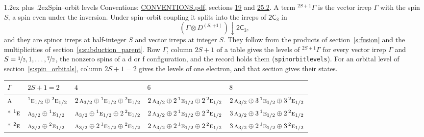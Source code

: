 \documentclass[10pt,a4paper]{article}
\makeatletter
\renewcommand\section{\@startsection{section}{1}{\z@}{-3ex plus -1ex minus -.2ex}%
  {1.2ex plus .2ex}{\normalfont\large\sffamily\bfseries\color{parttitle}}}
\numberwithin{equation}{section}
\newcommand{\grp}[1]{\mathsf{#1}}
\newcommand{\irr}[1]{\text{\normalfont\scshape #1}}
\newcommand{\conjpair}[1]{{}^{#1}}
\newcommand{\restr}[2]{#1\!\downarrow#2}
\newcommand{\irrJp}[2]{D^{(#1,#2)}}
\newcommand{\irrprod}{\otimes}
\newcommand{\term}[2]{{}^{#1}#2}
\makeatother
\begin{document}
\section{Spin--orbit levels}\label{s:spin_orbit}
Conventions: \href{../../CONVENTIONS.pdf}{CONVENTIONS.pdf}, sections \href{../../../rotation/CONVENTIONS.pdf\#conv.19}{19} and \href{../../CONVENTIONS.pdf\#conv.25.2}{25.2}.
\leavevmode\label{n:local.spin}\label{n:symbol.term}A term $\term{2S+1}{\Gamma}$ is the vector irrep $\Gamma$ with the spin $S$, a spin even under the inversion. Under spin--orbit coupling it splits into the irreps of $\grp{2C_{3}}$ in
\begin{equation}\label{e:spinorbit}\restr{(\Gamma \irrprod \irrJp{S}{+1})}{\grp{2C_{3}}},\end{equation}
and they are spinor irreps at half-integer $S$ and vector irreps at integer $S$. They follow from the products of section~\ref{s:fusion} and the multiplicities of section~\ref{s:subduction_parent}. Row $\Gamma$, column $2S + 1$ of a table gives the levels of $\term{2S+1}{\Gamma}$ for every vector irrep $\Gamma$ and $S = \nicefrac{1}{2}, 1, \dots, \nicefrac{7}{2}$, the nonzero spins of a d or f configuration, and the record holds them (\texttt{spinorbitlevels}). For an orbital level of section~\ref{s:spin_orbitals}, column $2S + 1 = 2$ gives the levels of one electron, and that section gives their states.
{\small\setlength{\tabcolsep}{3pt}\begin{longtable}{@{}lllll@{}}\toprule
$\Gamma$ & $2S + 1 = 2$ & $4$ & $6$ & $8$\\\midrule\endhead
\bottomrule\endfoot\endlastfoot
$\irr{a}$ & $\conjpair{1}\irr{e}_{1/2}\oplus \conjpair{2}\irr{e}_{1/2}$ & $2\,\irr{a}_{3/2}\oplus \conjpair{1}\irr{e}_{1/2}\oplus \conjpair{2}\irr{e}_{1/2}$ & $2\,\irr{a}_{3/2}\oplus 2\,\conjpair{1}\irr{e}_{1/2}\oplus 2\,\conjpair{2}\irr{e}_{1/2}$ & $2\,\irr{a}_{3/2}\oplus 3\,\conjpair{1}\irr{e}_{1/2}\oplus 3\,\conjpair{2}\irr{e}_{1/2}$\\*
$\conjpair{1}\irr{e}$ & $\irr{a}_{3/2}\oplus \conjpair{1}\irr{e}_{1/2}$ & $\irr{a}_{3/2}\oplus \conjpair{1}\irr{e}_{1/2}\oplus 2\,\conjpair{2}\irr{e}_{1/2}$ & $2\,\irr{a}_{3/2}\oplus 2\,\conjpair{1}\irr{e}_{1/2}\oplus 2\,\conjpair{2}\irr{e}_{1/2}$ & $3\,\irr{a}_{3/2}\oplus 3\,\conjpair{1}\irr{e}_{1/2}\oplus 2\,\conjpair{2}\irr{e}_{1/2}$\\*
$\conjpair{2}\irr{e}$ & $\irr{a}_{3/2}\oplus \conjpair{2}\irr{e}_{1/2}$ & $\irr{a}_{3/2}\oplus 2\,\conjpair{1}\irr{e}_{1/2}\oplus \conjpair{2}\irr{e}_{1/2}$ & $2\,\irr{a}_{3/2}\oplus 2\,\conjpair{1}\irr{e}_{1/2}\oplus 2\,\conjpair{2}\irr{e}_{1/2}$ & $3\,\irr{a}_{3/2}\oplus 2\,\conjpair{1}\irr{e}_{1/2}\oplus 3\,\conjpair{2}\irr{e}_{1/2}$\\
\bottomrule\end{longtable}}
\end{document}

